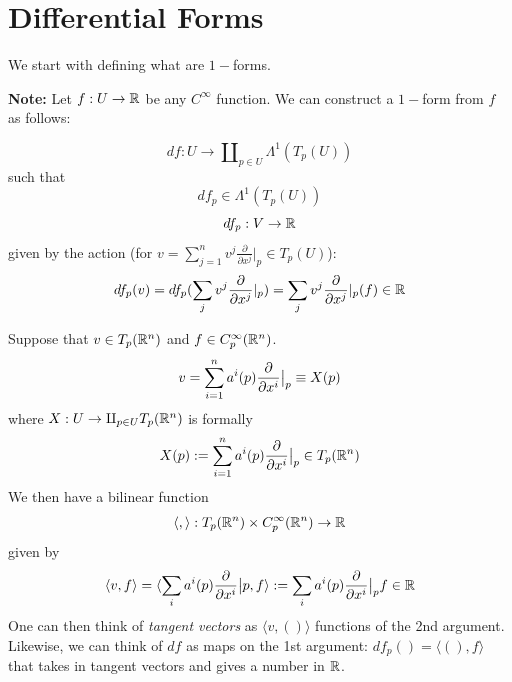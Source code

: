 \section{Differential Forms}

We start with defining what are $1-$forms.


\textbf{Note:} Let $f:U\to \mathbb{R}$ be any $C^{\infty}$ function. We can construct a $1-$form from $f$ as follows: 

$$df:U\to \amalg_{p\in U} \Lambda^1(T_p(U)) $$ such that $$df_p \in \Lambda^1(T_p(U))$$ $$df_p:V\to \mathbb{R} $$ given by the action (for $v=\sum_{j=1}^n v^j \frac{\partial}{\partial x^j}|_{p} \in T_p(U)$): $$df_p(v)=df_p(\sum_j v^j \frac{\partial}{\partial x^j}|_{p})= \sum_j v^j \frac{\partial}{\partial x^j}|_{p}(f) \in \mathbb{R} $$

Suppose that $v\in T_p(\mathbb{R}^n)$ and $f\in C^{\infty}_p (\mathbb{R}^n)$. $$v=\sum_{i=1}^n a^i(p)\frac{\partial}{\partial x^i}\big{|}_{p}\equiv X(p) $$ where $X:U\to \amalg_{p\in U} T_p(\mathbb{R}^n) $ is formally $$X(p):=\sum_{i=1}^n a^i(p) \frac{\partial}{\partial x^i}\big{|}_p\in T_p(\mathbb{R}^n)$$
We then have a bilinear function $$\langle , \rangle:T_p(\mathbb{R}^n)\times C^{\infty}_p(\mathbb{R}^n)\to \mathbb{R}$$ given by $$\langle v,f\rangle=\langle \sum_i a^i(p)\frac{\partial}{\partial x^i}\big{|}p,f \rangle:=\sum_i a^i(p)\frac{\partial}{\partial x^i}\big{|}_p f \in \mathbb{R}$$
One can then think of \emph{tangent vectors} as $\langle v,() \rangle$ functions of the 2nd argument. Likewise, we can think of $df$ as maps on the 1st argument: $df_p()=\langle (),f\rangle$ that takes in tangent vectors and gives a number in $\mathbb{R}$.


